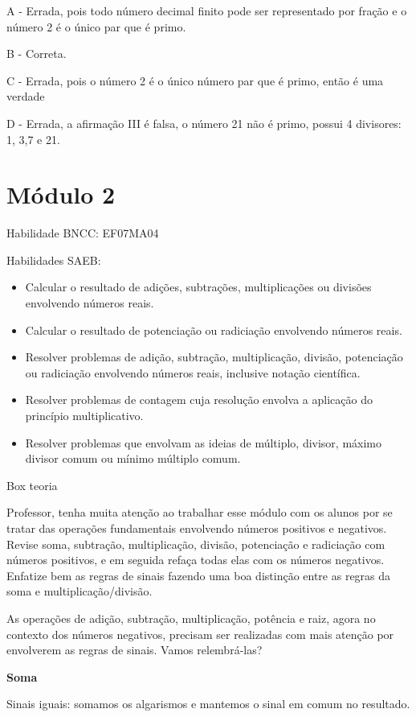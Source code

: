 A - Errada, pois todo número decimal finito pode ser representado por
fração e o número 2 é o único par que é primo.

B - Correta.

C - Errada, pois o número 2 é o único número par que é primo, então é
uma verdade

D - Errada, a afirmação III é falsa, o número 21 não é primo, possui 4
divisores: 1, 3,7 e 21.

\section{Módulo 2}

Habilidade BNCC: EF07MA04

Habilidades SAEB:

\begin{itemize}
\item
  Calcular o resultado de adições, subtrações, multiplicações ou
  divisões envolvendo números reais.
\item
  Calcular o resultado de potenciação ou radiciação envolvendo números
  reais.
\item
  Resolver problemas de adição, subtração, multiplicação, divisão,
  potenciação ou radiciação envolvendo números reais, inclusive notação
  científica.
\item
  Resolver problemas de contagem cuja resolução envolva a aplicação do
  princípio multiplicativo.
\item
  Resolver problemas que envolvam as ideias de múltiplo, divisor, máximo
  divisor comum ou mínimo múltiplo comum.
\end{itemize}

Box teoria

Professor, tenha muita atenção ao trabalhar esse módulo com os alunos
por se tratar das operações fundamentais envolvendo números positivos e
negativos. Revise soma, subtração, multiplicação, divisão, potenciação e
radiciação com números positivos, e em seguida refaça todas elas com os
números negativos. Enfatize bem as regras de sinais fazendo uma boa
distinção entre as regras da soma e multiplicação/divisão.

As operações de adição, subtração, multiplicação, potência e raiz, agora
no contexto dos números negativos, precisam ser realizadas com mais
atenção por envolverem as regras de sinais. Vamos relembrá-las?

\textbf{Soma}

Sinais iguais: somamos os algarismos e mantemos o sinal em comum no
resultado.

